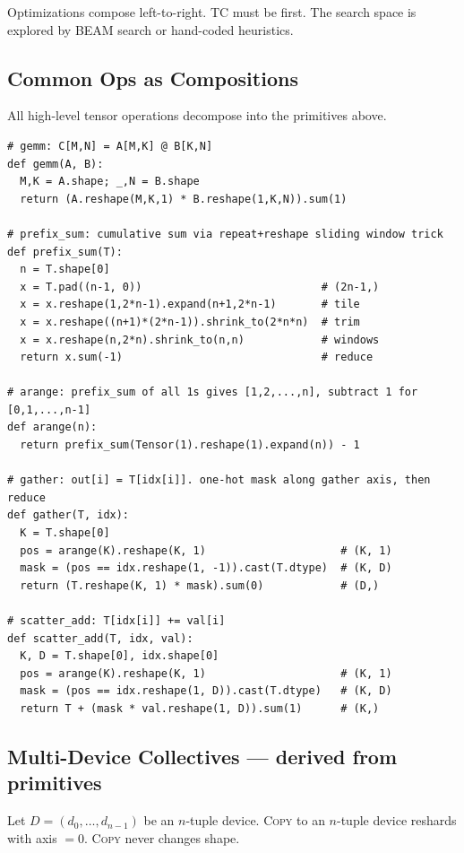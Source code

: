 \documentclass[10pt,letterpaper]{article}
\newcommand{\op}[1]{\textsc{#1}}
\begin{document}
\smallskip
Optimizations compose left-to-right. \op{TC} must be first. The search space is explored by BEAM search or hand-coded heuristics.

\subsection*{Common Ops as Compositions}

All high-level tensor operations decompose into the primitives above.

\begin{lstlisting}
# gemm: C[M,N] = A[M,K] @ B[K,N]
def gemm(A, B):
  M,K = A.shape; _,N = B.shape
  return (A.reshape(M,K,1) * B.reshape(1,K,N)).sum(1)

# prefix_sum: cumulative sum via repeat+reshape sliding window trick
def prefix_sum(T):
  n = T.shape[0]
  x = T.pad((n-1, 0))                            # (2n-1,)
  x = x.reshape(1,2*n-1).expand(n+1,2*n-1)       # tile
  x = x.reshape((n+1)*(2*n-1)).shrink_to(2*n*n)  # trim
  x = x.reshape(n,2*n).shrink_to(n,n)            # windows
  return x.sum(-1)                               # reduce

# arange: prefix_sum of all 1s gives [1,2,...,n], subtract 1 for [0,1,...,n-1]
def arange(n):
  return prefix_sum(Tensor(1).reshape(1).expand(n)) - 1

# gather: out[i] = T[idx[i]]. one-hot mask along gather axis, then reduce
def gather(T, idx):
  K = T.shape[0]
  pos = arange(K).reshape(K, 1)                     # (K, 1)
  mask = (pos == idx.reshape(1, -1)).cast(T.dtype)  # (K, D)
  return (T.reshape(K, 1) * mask).sum(0)            # (D,)

# scatter_add: T[idx[i]] += val[i]
def scatter_add(T, idx, val):
  K, D = T.shape[0], idx.shape[0]
  pos = arange(K).reshape(K, 1)                     # (K, 1)
  mask = (pos == idx.reshape(1, D)).cast(T.dtype)   # (K, D)
  return T + (mask * val.reshape(1, D)).sum(1)      # (K,)
\end{lstlisting}

\subsection*{{\color{multipurple}Multi-Device Collectives} \normalfont\small--- derived from primitives}

Let $D = (d_0, \ldots, d_{n-1})$ be an $n$-tuple device.
\op{Copy} to an $n$-tuple device reshards with axis $= 0$. \op{Copy} never changes shape.
\end{document}
